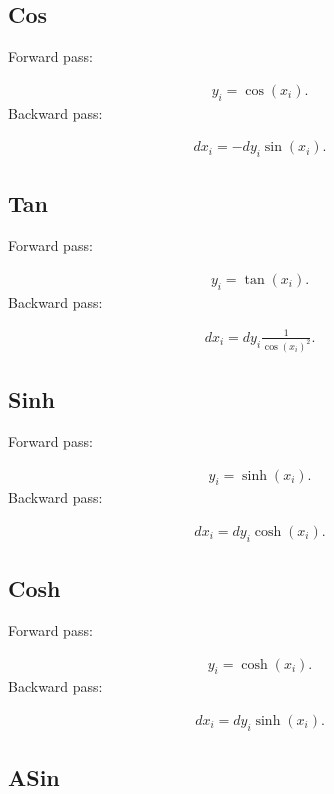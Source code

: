 \documentclass{article}
\begin{document}
\subsection{Cos}

Forward pass:

\begin{eqnarray}
  y_i = \cos (x_i).
\end{eqnarray}
%
Backward pass:

\begin{eqnarray}
  dx_i = -dy_i \sin(x_i).
\end{eqnarray}


\subsection{Tan}

Forward pass:

\begin{eqnarray}
  y_i = \tan (x_i).
\end{eqnarray}
%
Backward pass:

\begin{eqnarray}
  dx_i = dy_i \frac{1}{\cos(x_i)^2}. 
\end{eqnarray}


\subsection{Sinh}

Forward pass:

\begin{eqnarray}
  y_i = \sinh (x_i).
\end{eqnarray}
%
Backward pass:

\begin{eqnarray}
  dx_i = dy_i \cosh(x_i).
\end{eqnarray}


\subsection{Cosh}

Forward pass:

\begin{eqnarray}
  y_i = \cosh (x_i).
\end{eqnarray}
%
Backward pass:

\begin{eqnarray}
  dx_i = dy_i \sinh(x_i).
\end{eqnarray}


\subsection{ASin}
\end{document}
